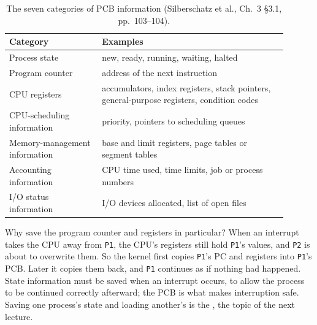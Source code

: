 \documentclass[11pt]{article}
\begin{document}
\begin{table}[h]
\centering\small
\renewcommand{\arraystretch}{1.25}
\begin{tabular}{@{}>{\raggedright\arraybackslash}p{0.3\linewidth}>{\raggedright\arraybackslash}p{0.6\linewidth}@{}}
\toprule
\textbf{Category} & \textbf{Examples} \\
\midrule
Process state & new, ready, running, waiting, halted \\
Program counter & address of the next instruction \\
CPU registers & accumulators, index registers, stack pointers, general-purpose registers, condition codes \\
CPU-scheduling information & priority, pointers to scheduling queues \\
Memory-management information & base and limit registers, page tables or segment tables \\
Accounting information & CPU time used, time limits, job or process numbers \\
I/O status information & I/O devices allocated, list of open files \\
\bottomrule
\end{tabular}
\caption{The seven categories of PCB information (Silberschatz et al., Ch.~3
\S3.1, pp.~103--104).}
\label{tab:pcbcat}
\end{table}

Why save the program counter and registers in particular? When an interrupt
takes the CPU away from \texttt{P1}, the CPU's registers still hold
\texttt{P1}'s values, and \texttt{P2} is about to overwrite them. So the kernel
first copies \texttt{P1}'s PC and registers into \texttt{P1}'s PCB. Later it
copies them back, and \texttt{P1} continues as if nothing had happened. State
information must be saved when an interrupt occurs, to allow the process to be
continued correctly afterward; the PCB is what makes interruption safe. Saving
one process's state and loading another's is the , the
topic of the next lecture.
\end{document}
